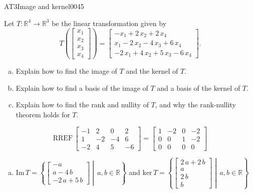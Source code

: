 \begin{exercise}{AT3}{Image and kernel}{0045} 
\begin{exerciseStatement} 

 Let \(T:\mathbb{R}^4 \to \mathbb{R}^3\) be the linear transformation given by \[T\left( \left[\begin{array}{c}
x_{1} \\
x_{2} \\
x_{3} \\
x_{4}
\end{array}\right] \right) = \left[\begin{array}{c}
-x_{1} + 2 \, x_{2} + 2 \, x_{4} \\
x_{1} - 2 \, x_{2} - 4 \, x_{3} + 6 \, x_{4} \\
-2 \, x_{1} + 4 \, x_{2} + 5 \, x_{3} - 6 \, x_{4}
\end{array}\right].\] 

 

\begin{enumerate}[(a)]
\item Explain how to find the image of \(T\) and the kernel of \(T\).
\item Explain how to find a basis of the image of \(T\) and a basis of the kernel of \(T\).
\item Explain how to find the rank and nullity of \(T\), and why the rank-nullity theorem holds for \(T\).
\end{enumerate}

     \end{exerciseStatement}
 \begin{exerciseAnswer} 

\[\mathrm{RREF}\,\left[\begin{array}{cccc}
-1 & 2 & 0 & 2 \\
1 & -2 & -4 & 6 \\
-2 & 4 & 5 & -6
\end{array}\right]=\left[\begin{array}{cccc}
1 & -2 & 0 & -2 \\
0 & 0 & 1 & -2 \\
0 & 0 & 0 & 0
\end{array}\right]\]

 

\begin{enumerate}[(a)]
\item  

 \(\mathrm{Im}\,T =  \left\{ \left[\begin{array}{c}
-a \\
a - 4 \, b \\
-2 \, a + 5 \, b
\end{array}\right] \middle|\,a,b\in\mathbb{R}\right\}\) and \(\mathrm{ker}\,T = \left\{ \left[\begin{array}{c}
2 \, a + 2 \, b \\
a \\
2 \, b \\
b
\end{array}\right] \middle|\,a,b\in\mathbb{R}\right\}\) 


\end{enumerate}
\end{exerciseAnswer}
\end{exercise}

